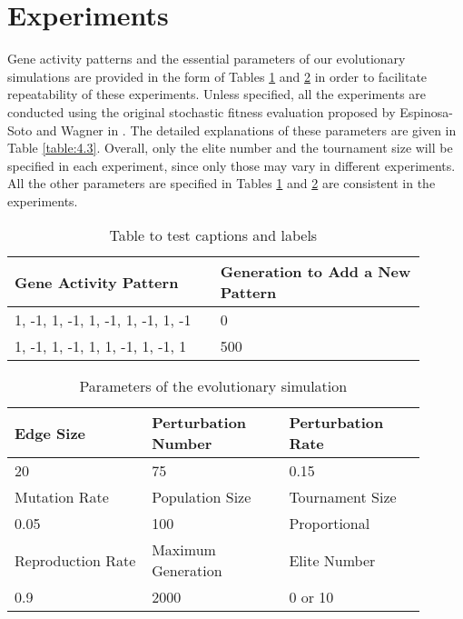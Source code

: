 \section{Experiments}
Gene activity patterns and the essential parameters of our evolutionary simulations are provided in the form of Tables \ref{table:4.1} and \ref{table:4.2} in order to facilitate repeatability of these experiments. Unless specified, all the experiments are conducted using the original stochastic fitness evaluation proposed by Espinosa-Soto and Wagner in \cite{espinosa2010specialization}. The detailed explanations of these parameters are given in Table \ref{table:4.3}. Overall, only the elite number and the tournament size will be specified in each experiment, since only those may vary in different experiments. All the other parameters are specified in Tables \ref{table:4.1} and \ref{table:4.2} are consistent in the experiments. 

\begin{table}[h]
	\centering
	\caption{Table to test captions and labels}
	\label{table:4.1}
	\begin{tabular}{|p{0.45\linewidth} | p{0.45\linewidth}|} 
		\hline
		Gene Activity Pattern & Generation to Add a New Pattern \\ [0.5ex] 
		\hline
		1, -1, 1, -1, 1, -1, 1, -1, 1, -1 & 0 \\ 
		\hline
		1, -1, 1, -1, 1, 1, -1, 1, -1, 1 & 500 \\
		\hline
	\end{tabular}
\end{table}

\begin{table}[h]
	\centering
	\caption{Parameters of the evolutionary simulation}
	\label{table:4.2}
	\begin{tabular}{|p{0.3\linewidth} | p{0.3\linewidth} | p{0.3\linewidth} |} 
		\hline
		Edge Size & Perturbation Number & Perturbation Rate \\
		\hline
		20 & 75 & 0.15 \\
		\hline
		Mutation Rate & Population Size & Tournament Size \\
		\hline
		0.05 & 100 & Proportional \\
		\hline
		Reproduction Rate & Maximum Generation & Elite Number \\
		\hline
		0.9 & 2000 & 0 or 10 \\
		\hline
	\end{tabular}
\end{table}

